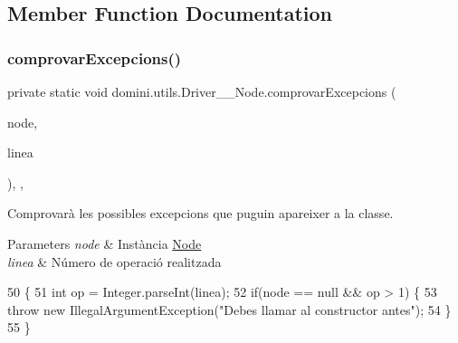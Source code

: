\subsection{Member Function Documentation}
\mbox{\label{classdomini_1_1utils_1_1Driver____Node_a9fdd311953250227bb70d67cbf20bbb4}} 
\subsubsection{\texorpdfstring{comprovar\+Excepcions()}{comprovarExcepcions()}}
{\footnotesize\ttfamily private static void domini.\+utils.\+Driver\+\_\+\+\_\+\+Node.\+comprovar\+Excepcions (\begin{DoxyParamCaption}\item[{\hyperlink{classdomini_1_1utils_1_1Node}{Node}}]{node,  }\item[{String}]{linea }\end{DoxyParamCaption})\hspace{0.3cm}{\ttfamily [inline]}, {\ttfamily [static]}, {\ttfamily [private]}}



Comprovarà les possibles excepcions que puguin apareixer a la classe. 


\begin{DoxyParams}{Parameters}
{\em node} & Instància \hyperlink{classdomini_1_1utils_1_1Node}{Node} \\
\hline
{\em linea} & Número de operació realitzada \\
\hline
\end{DoxyParams}

\begin{DoxyCode}
50                                                                     \{
51         \textcolor{keywordtype}{int} op = Integer.parseInt(linea);
52         \textcolor{keywordflow}{if}(node == null && op > 1) \{
53             \textcolor{keywordflow}{throw} \textcolor{keyword}{new} IllegalArgumentException(\textcolor{stringliteral}{"Debes llamar al constructor antes"});
54         \}
55     \}
\end{DoxyCode}
\mbox{\label{classdomini_1_1utils_1_1Driver____Node_abfb5f35b8100dec9d147a79af04df017}} 

